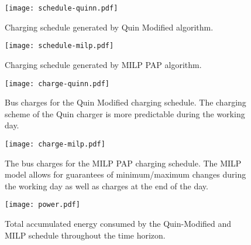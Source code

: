\begin{subfigures}
    \begin{figure}[htpb]
    \centering
        \texttt{[image: schedule-quinn.pdf]}
        \caption{Charging schedule generated by Quin Modified algorithm.}
        \label{subfig:quin-schedule}
    \end{figure}

    \hfill

    \begin{figure}[htpb]
    \centering
        \texttt{[image: schedule-milp.pdf]}
        \caption{Charging schedule generated by MILP PAP algorithm.}
        \label{subfig:milp-schedule}
    \end{figure}
\end{subfigures}

\begin{subfigures}
    \begin{figure}[htpb]
    \centering
        \texttt{[image: charge-quinn.pdf]}
        \caption{Bus charges for the Quin Modified charging schedule. The charging scheme of the Quin charger is more predictable during the working day.}
        \label{subfig:quin-charge}
    \end{figure}

    \hfill

    \begin{figure}[htpb]
    \centering
        \texttt{[image: charge-milp.pdf]}
        \caption{The bus charges for the MILP PAP charging schedule. The MILP model allows for guarantees of minimum/maximum changes during the working day as well as charges at the end of the day.}
        \label{subfig:milp-charge}
    \end{figure}
\end{subfigures}

\begin{figure}[htpb]
\centering
    \texttt{[image: power.pdf]}
    \caption{Total accumulated energy consumed by the Quin-Modified and MILP schedule throughout the time horizon.}
    \label{fig:power-usage}
\end{figure}

